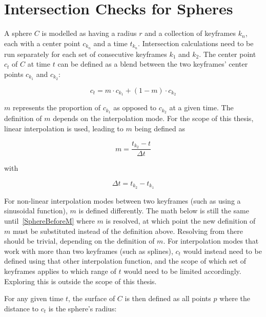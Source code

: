 \section{Intersection Checks for Spheres}

A sphere \(C\) is modelled as having a radius \(r\) and a collection of keyframes \(k_n\), each with a center point \(c_{k_n}\) and a time \(t_{k_n}\).
Intersection calculations need to be run separately for each set of consecutive keyframes \(k_1\) and \(k_2\).
\newline
The center point \(c_t\) of \(C\) at time \(t\) can be defined
as a blend between the two keyframes' center points \(c_{k_1}\) and \(c_{k_2}\):

\begin{equation}
    c_t = m \cdot c_{k_1} + (1-m) \cdot c_{k_2}
\end{equation}

\(m\) represents the proportion of \(c_{k_1}\) as opposed to \(c_{k_2}\) at a given time.
The definition of \(m\) depends on the interpolation mode.
For the scope of this thesis, linear interpolation is used, leading to \(m\) being defined as

\begin{equation}\label{MDef}
    m = \frac{t_{k_2} - t}{\Delta t}
\end{equation}

with

\begin{equation}
    \Delta t = t_{k_2} - t_{k_1}
\end{equation}

For non-linear interpolation modes between two keyframes (such as using a sinusoidal function),
\(m\) is defined differently. The math below is still the same until~\eqref{SphereBeforeM} where \(m\) is resolved,
at which point the new definition of \(m\) must be substituted instead of the definition above.
Resolving from there should be trivial, depending on the definition of \(m\).
\newline
For interpolation modes that work with more than two keyframes (such as splines),
\(c_t\) would instead need to be defined using that other interpolation function,
and the scope of which set of keyframes applies to which range of \(t\) would need to be limited accordingly.
Exploring this is outside the scope of this thesis.
\newline

For any given time \(t\),
the surface of \(C\) is then defined as all points \(p\) where the distance to \(c_t\) is the sphere's radius:

